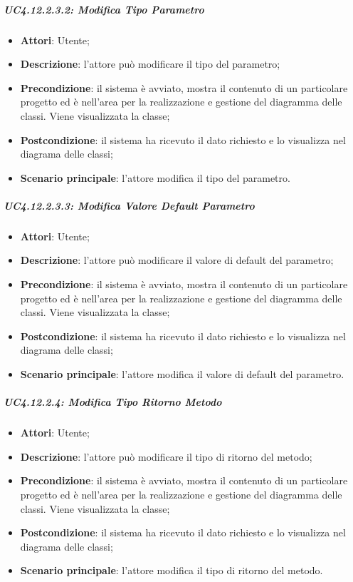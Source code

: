 \subparagraph{UC4.12.2.3.2: Modifica Tipo Parametro}
\label{UC4.12.2.3.2}
\begin{itemize}
	\item \textbf{Attori}: Utente;
	\item \textbf{Descrizione}: l'attore può modificare il tipo del parametro;
	\item \textbf{Precondizione}: il sistema è avviato, mostra il contenuto di un particolare progetto ed è nell'area per la realizzazione e gestione del diagramma delle classi. Viene visualizzata la classe;
	\item \textbf{Postcondizione}: il sistema ha ricevuto il dato richiesto e lo visualizza nel diagrama delle classi;
	\item \textbf{Scenario principale}: l'attore modifica il tipo del parametro.
\end{itemize}

\subparagraph{UC4.12.2.3.3: Modifica Valore Default Parametro}
\label{UC4.12.2.3.3}
\begin{itemize}
	\item \textbf{Attori}: Utente;
	\item \textbf{Descrizione}: l'attore può modificare il valore di default del parametro;
	\item \textbf{Precondizione}: il sistema è avviato, mostra il contenuto di un particolare progetto ed è nell'area per la realizzazione e gestione del diagramma delle classi. Viene visualizzata la classe;
	\item \textbf{Postcondizione}: il sistema ha ricevuto il dato richiesto e lo visualizza nel diagrama delle classi;
	\item \textbf{Scenario principale}: l'attore modifica il valore di default del parametro.
\end{itemize}

\subparagraph{UC4.12.2.4: Modifica Tipo Ritorno Metodo}
\label{UC4.12.2.4}
\begin{itemize}
	\item \textbf{Attori}: Utente;
	\item \textbf{Descrizione}: l'attore può modificare il tipo di ritorno del metodo;
	\item \textbf{Precondizione}: il sistema è avviato, mostra il contenuto di un particolare progetto ed è nell'area per la realizzazione e gestione del diagramma delle classi. Viene visualizzata la classe;
	\item \textbf{Postcondizione}: il sistema ha ricevuto il dato richiesto e lo visualizza nel diagrama delle classi;
	\item \textbf{Scenario principale}: l'attore modifica il tipo di ritorno del metodo.
\end{itemize}

